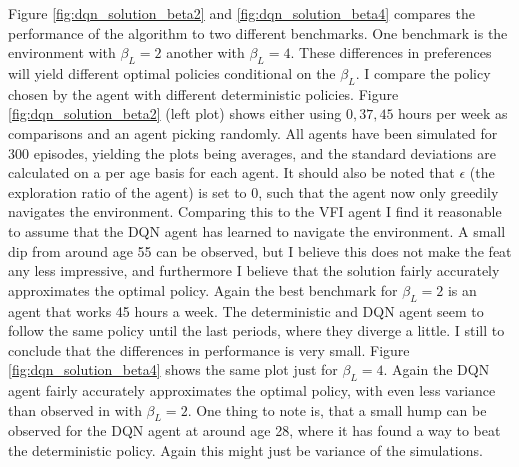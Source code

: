 Figure \ref{fig:dqn_solution_beta2} and \ref{fig:dqn_solution_beta4} compares the performance of the algorithm to two different benchmarks. One benchmark is the environment with $\beta_L = 2$ another with $\beta_L=4$. These differences in preferences will yield different optimal policies conditional on the $\beta_L$. I compare the policy chosen by the agent with different deterministic policies. Figure \ref{fig:dqn_solution_beta2} (left plot) shows either using $0, 37, 45$ hours per week as comparisons and an agent picking randomly. All agents have been simulated for 300 episodes, yielding the plots being averages, and the standard deviations are calculated on a per age basis for each agent. It should also be noted that $\epsilon$ (the exploration ratio of the agent) is set to 0, such that the agent now only greedily navigates the environment. Comparing this to the VFI agent I find  it reasonable to assume that the DQN agent has learned to navigate the environment. A small dip from around age 55 can be observed, but I believe this does not make the feat any less impressive, and furthermore I believe that the solution fairly accurately approximates the optimal policy. Again the best benchmark for $\beta_L = 2$ is an agent that works 45 hours a week. The deterministic and DQN agent seem to follow the same policy until  the last periods, where they diverge a little. I still to conclude that the differences in performance is very small. Figure \ref{fig:dqn_solution_beta4} shows the same plot just for $\beta_L = 4$. Again the DQN agent fairly accurately approximates the optimal policy, with even less variance than observed in with $\beta_L = 2$. One thing to note is, that a small hump can be observed for the DQN agent at around age 28, where it has found a way to beat the deterministic policy. Again this might just be variance of the simulations. 


